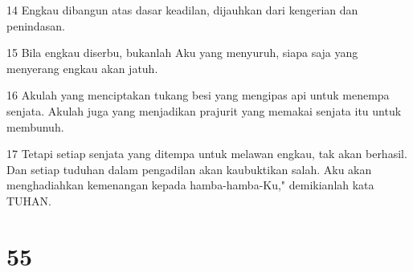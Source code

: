 \par 14 Engkau dibangun atas dasar keadilan, dijauhkan dari kengerian dan penindasan.
\par 15 Bila engkau diserbu, bukanlah Aku yang menyuruh, siapa saja yang menyerang engkau akan jatuh.
\par 16 Akulah yang menciptakan tukang besi yang mengipas api untuk menempa senjata. Akulah juga yang menjadikan prajurit yang memakai senjata itu untuk membunuh.
\par 17 Tetapi setiap senjata yang ditempa untuk melawan engkau, tak akan berhasil. Dan setiap tuduhan dalam pengadilan akan kaubuktikan salah. Aku akan menghadiahkan kemenangan kepada hamba-hamba-Ku," demikianlah kata TUHAN.

\chapter{55}

